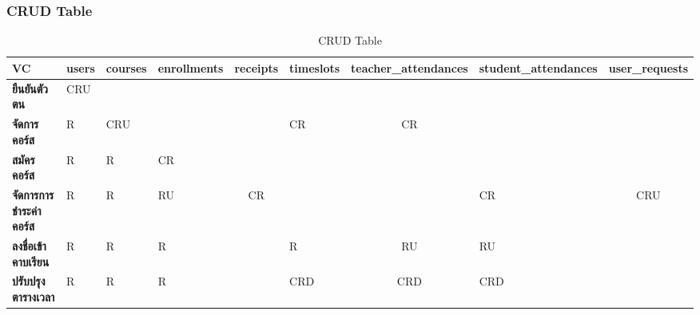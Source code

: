 \begin{landscape}
\subsubsection{CRUD Table}

\begin{table}[H]
\caption{CRUD Table}
\label{tab:crud-table-draft}
\begin{tabularx}{\textwidth}{|l|X|X|X|l|X|l|X|l|}
\hline
\multicolumn{1}{|X|}{\textbf{VC}} & \textbf{users} & \textbf{courses}      & \textbf{enrollments}  & \multicolumn{1}{c|}{\textbf{receipts}} & \textbf{timeslots}    & \multicolumn{1}{c|}{\textbf{teacher\_attendances}} & \textbf{student\_attendances} & \multicolumn{1}{c|}{\textbf{user\_requests}} \\ \hline
\textbf{ยืนยันตัวตน}              & CRU            & \multicolumn{1}{l|}{} & \multicolumn{1}{l|}{} &                                        & \multicolumn{1}{l|}{} &                                                    & \multicolumn{1}{l|}{}         &                                              \\ \hline
\textbf{จัดการคอร์ส}              & R              & CRU                   & \multicolumn{1}{l|}{} &                                        & CR                    & \multicolumn{1}{c|}{CR}                            & \multicolumn{1}{l|}{}         &                                              \\ \hline
\textbf{สมัครคอร์ส}               & R              & R                     & CR                    &                                        & \multicolumn{1}{l|}{} &                                                    & \multicolumn{1}{l|}{}         &                                              \\ \hline
\textbf{จัดการการชำระค่าคอร์ส}    & R              & R                     & RU                    & \multicolumn{1}{c|}{CR}                & \multicolumn{1}{l|}{} &                                                    & CR                            & \multicolumn{1}{c|}{CRU}                     \\ \hline
\textbf{ลงชื่อเข้าคาบเรียน}       & R              & R                     & R                     &                                        & R                     & \multicolumn{1}{c|}{RU}                            & RU                            &                                              \\ \hline
\textbf{ปรับปรุงตารางเวลา}        & R              & R                     & R                     &                                        & CRD                   & \multicolumn{1}{c|}{CRD}                           & CRD                           &                                              \\ \hline

\end{tabularx}
\end{table}
\end{landscape}
